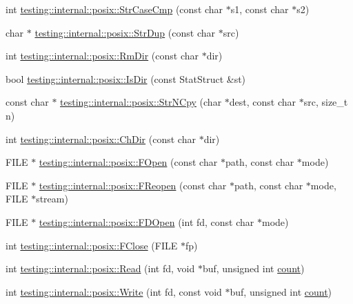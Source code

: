\begin{DoxyCompactItemize}
\item 
int \hyperlink{namespacetesting_1_1internal_1_1posix_a1ef2385a7f8e4c706054da35967e76bd}{testing\+::internal\+::posix\+::\+Str\+Case\+Cmp} (const char $\ast$s1, const char $\ast$s2)
\item 
char $\ast$ \hyperlink{namespacetesting_1_1internal_1_1posix_a8e352884793a65ae8be144676f1a9136}{testing\+::internal\+::posix\+::\+Str\+Dup} (const char $\ast$src)
\item 
int \hyperlink{namespacetesting_1_1internal_1_1posix_acbad5d4ea5b73fd1765f5f760642932a}{testing\+::internal\+::posix\+::\+Rm\+Dir} (const char $\ast$dir)
\item 
bool \hyperlink{namespacetesting_1_1internal_1_1posix_af0d04ed5baeed28353fa38742748a421}{testing\+::internal\+::posix\+::\+Is\+Dir} (const Stat\+Struct \&st)
\item 
const char $\ast$ \hyperlink{namespacetesting_1_1internal_1_1posix_a36fca815713332e5c6dc92c98b6b2574}{testing\+::internal\+::posix\+::\+Str\+N\+Cpy} (char $\ast$dest, const char $\ast$src, size\+\_\+t n)
\item 
int \hyperlink{namespacetesting_1_1internal_1_1posix_a1ddc8a4fc6bb21da372307485591a212}{testing\+::internal\+::posix\+::\+Ch\+Dir} (const char $\ast$dir)
\item 
F\+I\+LE $\ast$ \hyperlink{namespacetesting_1_1internal_1_1posix_a4042201dcc4932641d484e7ddf94de7d}{testing\+::internal\+::posix\+::\+F\+Open} (const char $\ast$path, const char $\ast$mode)
\item 
F\+I\+LE $\ast$ \hyperlink{namespacetesting_1_1internal_1_1posix_a9ef6d089cdae03f9d9e0e6d379c40703}{testing\+::internal\+::posix\+::\+F\+Reopen} (const char $\ast$path, const char $\ast$mode, F\+I\+LE $\ast$stream)
\item 
F\+I\+LE $\ast$ \hyperlink{namespacetesting_1_1internal_1_1posix_af7c268eba32d5a718b36b6b3801302e0}{testing\+::internal\+::posix\+::\+F\+D\+Open} (int fd, const char $\ast$mode)
\item 
int \hyperlink{namespacetesting_1_1internal_1_1posix_af4beeaaa8d62916d5e3b644a1ddfbd6b}{testing\+::internal\+::posix\+::\+F\+Close} (F\+I\+LE $\ast$fp)
\item 
int \hyperlink{namespacetesting_1_1internal_1_1posix_a3c6ab13e581a56f1b02f3eb7536c97fd}{testing\+::internal\+::posix\+::\+Read} (int fd, void $\ast$buf, unsigned int \hyperlink{gmock__stress__test_8cc_afd9db40e3361ae09188795e8cbe19752}{count})
\item 
int \hyperlink{namespacetesting_1_1internal_1_1posix_af4acf9f78d55f815a18b43786511abef}{testing\+::internal\+::posix\+::\+Write} (int fd, const void $\ast$buf, unsigned int \hyperlink{gmock__stress__test_8cc_afd9db40e3361ae09188795e8cbe19752}{count})

\end{DoxyCompactItemize}
